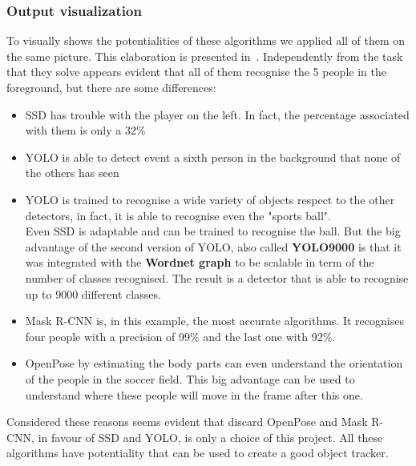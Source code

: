 \subsubsection*{Output visualization}
To visually shows the potentialities of these algorithms we applied all of them on the same picture. This elaboration is presented in~. Independently from the task that they solve appears evident that all of them recognise the 5 people in the foreground, but there are some differences:
\begin{itemize}
	\item SSD has trouble with the player on the left. In fact, the percentage associated with them is only a 32\%
	\item YOLO is able to detect event a sixth person in the background that none of the others has seen
	\item YOLO is trained to recognise a wide variety of objects respect to the other detectors, in fact, it is able to recognise even the "sports ball".\\
	Even SSD is adaptable and can be trained to recognise the ball. But the big advantage of the second version of YOLO, also called \textbf{YOLO9000} is that it was integrated with the \textbf{Wordnet graph}\cite{wordnet} to be scalable in term of the number of classes recognised. The result is a detector that is able to recognise up to 9000 different classes.
	\item Mask R-CNN is, in this example, the most accurate algorithms. It recognises four people with a precision of 99\% and the last one with 92\%. 
	\item OpenPose by estimating the body parts can even understand the orientation of the people in the soccer field. This big advantage can be used to understand where these people will move in the frame after this one.
\end{itemize}
Considered these reasons seems evident that discard OpenPose and Mask R-CNN, in favour of SSD and YOLO, is only a choice of this project. All these algorithms have potentiality that can be used to create a good object tracker.

